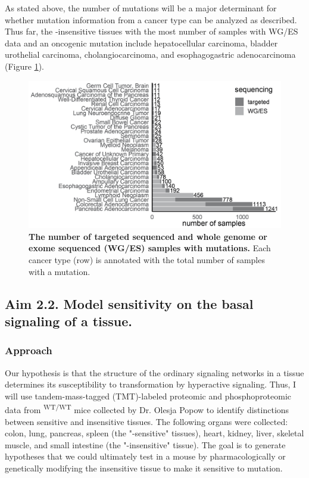 As stated above, the number of \KRAS{} mutations will be a major determinant for whether mutation information from a cancer type can be analyzed as described.
Thus far, the \KRAS{}-insensitive tissues with the most number of samples with WG/ES data and an oncogenic \KRAS{} mutation include hepatocellular carcinoma, bladder urothelial carcinoma, cholangiocarcinoma, and esophagogastric adenocarcinoma (Figure \ref{fig:num-samples-kras-resistant}).

\begin{figure}[t!]
\centering
\includegraphics[width=120mm]{figures/aim2/kras-mutations-from-insensitive-tissues.jpg}
\caption{
    \textbf{The number of targeted sequenced and whole genome or exome sequenced (WG/ES) samples with \KRAS{} mutations.}
    Each cancer type (row) is annotated with the total number of samples with a \KRAS{} mutation.
}
\label{fig:num-samples-kras-resistant}
\end{figure}


\subsection*{Aim 2.2. Model \KRAS{} sensitivity on the basal signaling of a tissue.}

\subsubsection*{Approach}

Our hypothesis is that the structure of the ordinary signaling networks in a tissue determines its susceptibility to transformation by hyperactive \kras{} signaling.
Thus, I will use tandem-mass-tagged (TMT)-labeled \cite{Thompson2003} proteomic and phosphoproteomic data from \moKRAS{}\textsuperscript{WT/WT} mice collected by Dr. Olesja Popow to identify distinctions between sensitive and insensitive tissues.
The following organs were collected: colon, lung, pancreas, spleen (the "\KRAS{}-sensitive" tissues), heart, kidney, liver, skeletal muscle, and small intestine (the "\KRAS{}-insensitive" tissue).
The goal is to generate hypotheses that we could ultimately test in a mouse by pharmacologically or genetically modifying the insensitive tissue to make it sensitive to \KRAS{} mutation.

